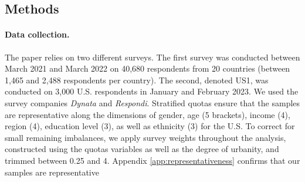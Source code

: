 \begin{small} %
\section*{\normalsize Methods} %
\paragraph{\small Data collection.} %
The paper relies on two different surveys. The first survey was conducted between March 2021 and March 2022 on 40,680 respondents from 20 countries  (between 1,465 and 2,488 respondents per country). The second, denoted US1, was conducted on 3,000 U.S. respondents in January and February 2023. We used the survey companies \emph{Dynata} and \emph{Respondi}. Stratified quotas ensure that the samples are representative along the dimensions of gender, age (5 brackets), income (4), region (4), education level (3), as well as ethnicity (3) for the U.S. %
To correct for small remaining imbalances, we apply survey weights throughout the analysis, constructed using the quotas variables as well as the degree of urbanity, and trimmed between 0.25 and 4. %
Appendix \ref{app:representativeness} confirms that our samples are representative


\end{small}
